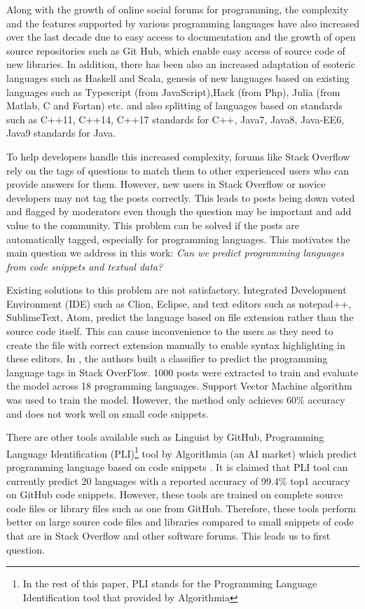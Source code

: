 \documentclass[letterpaper, 10 pt, conference]{ieeeconf}  %
\begin{document}
Along with the growth of online social forums for programming, the complexity and the features supported by various programming languages have also increased over the last decade due to easy access to documentation and the growth of open source repositories such as Git Hub, which enable easy access of source code of new libraries. In addition, there has been also an increased adaptation of esoteric languages such as Haskell and Scala, genesis of new languages based on existing languages such as Typescript (from JavaScript),Hack (from Php), Julia (from Matlab, C and Fortan) etc. and also splitting of languages based on standards such as  C++11, C++14, C++17 standards for C++, Java7, Java8, Java-EE6, Java9 standards for Java.
 
% 
To help developers handle this increased complexity, forums like Stack Overflow rely on the tags of questions to match them to other experienced users who can provide answers for them. However, new users in Stack Overflow or novice developers may not tag the posts correctly. This leads to posts being down voted and flagged by moderators even though the question may be important and add value to the community. This problem can be solved if the posts are automatically tagged, especially for programming languages. This motivates the main question we address in this work: {\em Can we predict programming languages from code snippets and textual data?}
 
Existing solutions to this problem are not satisfactory. Integrated Development Environment (IDE) such as Clion, Eclipse, and text editors such as notepad++, SublimeText, Atom, predict the language based on file extension rather than the source code itself. This can cause inconvenience to the users as they need to create the file with correct extension manually to enable syntax highlighting in these editors. In \cite{c18}, the authors built a classifier to predict the programming language tags in Stack OverFlow. 1000 posts were extracted to train and evaluate the model across 18 programming languages. Support Vector Machine algorithm was used to train the model. However, the method only achieves 60\% accuracy and does not work well on small code snippets.
 
There are other tools available such as Linguist by GitHub, Programming Language Identification (PLI)\footnote[1]{In the rest of this paper, PLI stands for the Programming Language Identification tool that provided by Algorithmia} tool by Algorithmia (an AI market) which predict programming language based on code snippets \cite{c12}. It is claimed that PLI tool can currently predict 20 languages with a reported accuracy of 99.4\% top1 accuracy on GitHub code snippets. However, these tools are trained on complete source code files or library files such as one from GitHub. Therefore, these tools perform better on large source code files and libraries compared to small snippets of code that are in Stack Overflow and other software forums. This leads us to first question.
\end{document}
